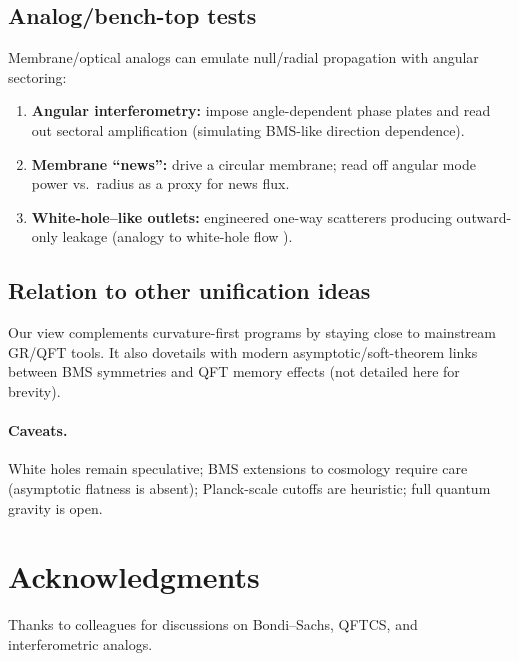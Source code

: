 \documentclass[12pt]{article}
\begin{document}
\subsection{Analog/bench-top tests}
Membrane/optical analogs can emulate null/radial propagation with angular sectoring:
\begin{enumerate}[leftmargin=1.2em]
\item \textbf{Angular interferometry:} impose angle-dependent phase plates and read out sectoral amplification (simulating BMS-like direction dependence).
\item \textbf{Membrane ``news'':} drive a circular membrane; read off angular mode power vs.\ radius as a proxy for news flux.
\item \textbf{White-hole–like outlets:} engineered one-way scatterers producing outward-only leakage (analogy to white-hole flow \citep{deLorenzo2016}).
\end{enumerate}

\subsection{Relation to other unification ideas}
Our view complements curvature-first programs \citep{CheokInspire} by staying close to mainstream GR/QFT tools. It also dovetails with modern asymptotic/soft-theorem links between BMS symmetries and QFT memory effects (not detailed here for brevity).

\paragraph{Caveats.}
White holes remain speculative; BMS extensions to cosmology require care (asymptotic flatness is absent); Planck-scale cutoffs are heuristic; full quantum gravity is open.

\section*{Acknowledgments}
Thanks to colleagues for discussions on Bondi–Sachs, QFTCS, and interferometric analogs.
\end{document}
